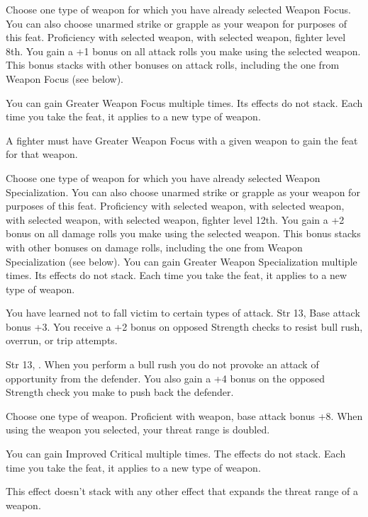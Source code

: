 {Choose one type of weapon for which you have already selected Weapon Focus. You can also choose unarmed strike or grapple as your weapon for purposes of this feat.}
{Proficiency with selected weapon,  with selected weapon, fighter level 8th.}
{You gain a +1 bonus on all attack rolls you make using the selected weapon. This bonus stacks with other bonuses on attack rolls, including the one from Weapon Focus (see below).}{}
{You can gain Greater Weapon Focus multiple times. Its effects do not stack. Each time you take the feat, it applies to a new type of weapon.

A fighter must have Greater Weapon Focus with a given weapon to gain the  feat for that weapon.}

{Choose one type of weapon for which you have already selected Weapon Specialization. You can also choose unarmed strike or grapple as your weapon for purposes of this feat.}
{Proficiency with selected weapon,  with selected weapon,  with selected weapon,  with selected weapon, fighter level 12th.}
{You gain a +2 bonus on all damage rolls you make using the selected weapon. This bonus stacks with other bonuses on damage rolls, including the one from Weapon Specialization (see below).}{}
{You can gain Greater Weapon Specialization multiple times. Its effects do not stack. Each time you take the feat, it applies to a new type of weapon.}

{You have learned not to fall victim to certain types of attack.}
{Str 13, Base attack bonus +3.}
{You receive a +2 bonus on opposed Strength checks to resist bull rush, overrun, or trip attempts.}{}{}

{}
{Str 13, .}
{When you perform a bull rush you do not provoke an attack of opportunity from the defender. You also gain a +4 bonus on the opposed Strength check you make to push back the defender.}{}{}

{Choose one type of weapon.}
{Proficient with weapon, base attack bonus +8.}
{When using the weapon you selected, your threat range is doubled.}{}
{You can gain Improved Critical multiple times. The effects do not stack. Each time you take the feat, it applies to a new type of weapon.

This effect doesn't stack with any other effect that expands the threat range of a weapon.}{}

